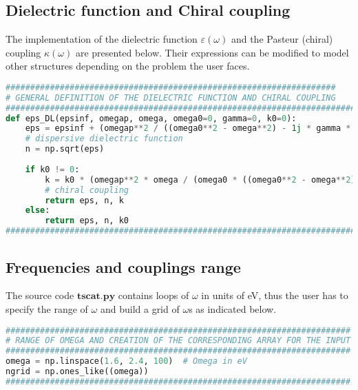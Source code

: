 \documentclass[showpacs,aps,prl,onecolumn,superscriptaddress]{revtex4-1}
\begin{document}
\subsection{Dielectric function and Chiral coupling}
The implementation of the dielectric function $\varepsilon\left(\omega\right)$ and the Pasteur (chiral) coupling $\kappa\left(\omega\right)$ are presented below. Their expressions can be modified to model other structures depending on the problem the user faces.
\begin{lstlisting}[language=Python, caption=Implementation of dielectric and chiral dispersive properties.]
###################################################################
# GENERAL DEFINITION OF THE DIELECTRIC FUNCTION AND CHIRAL COUPLING
###############################################################################################
def eps_DL(epsinf, omegap, omega, omega0=0, gamma=0, k0=0):
    eps = epsinf + (omegap**2 / ((omega0**2 - omega**2) - 1j * gamma * omega))  
    # dispersive dielectric function
    n = np.sqrt(eps)
    
    if k0 != 0:
        k = k0 * (omegap**2 * omega / (omega0 * ((omega0**2 - omega**2) - 1j * gamma * omega)))  
        # chiral coupling
        return eps, n, k
    else:
        return eps, n, k0
###############################################################################################
\end{lstlisting}

\subsection{Frequencies and couplings range}
The source code $\mathbf{tscat.py}$ contains loops of $\omega$ in units of eV, thus the user has to specify the range of $\omega$ and build a grid of $\omega$s as indicated below.
\begin{lstlisting}[language=Python, caption=Range of $\omega$ in eV and corresponding grid.]
######################################################################
# RANGE OF OMEGA AND CREATION OF THE CORRESPONDING ARRAY FOR THE INPUT
######################################################################
omega = np.linspace(1.6, 2.4, 100)  # Omega in eV
ngrid = np.ones_like((omega))
######################################################################
\end{lstlisting}
\end{document}
